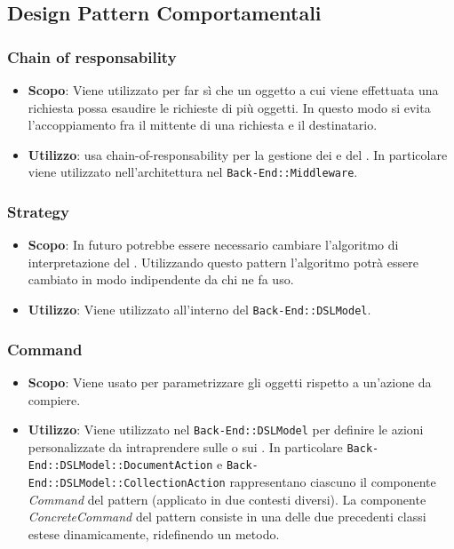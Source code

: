 \subsection{Design Pattern Comportamentali}

\subsubsection{Chain of responsability}
\label{chain-of-responsability}

\begin{itemize}

	\item \textbf{Scopo}: Viene utilizzato per far sì che un oggetto a cui viene effettuata una richiesta possa esaudire le richieste di più oggetti. In questo modo si evita l'accoppiamento fra il mittente di una richiesta e il destinatario.
	\item \textbf{Utilizzo}:  usa chain-of-responsability per la gestione dei  e del . In particolare viene utilizzato nell'architettura nel  \texttt{Back-End::Middleware}.

\end{itemize}

\subsubsection{Strategy}

\begin{itemize}

	\item \textbf{Scopo}: In futuro potrebbe essere necessario cambiare l'algoritmo di interpretazione del . Utilizzando questo pattern l'algoritmo potrà essere cambiato in modo indipendente da chi ne fa uso.
	\item \textbf{Utilizzo}: Viene utilizzato all'interno del  \texttt{Back-End::DSLModel}.

\end{itemize}

\subsubsection{Command}

\begin{itemize}

	\item \textbf{Scopo}: Viene usato per parametrizzare gli oggetti rispetto a un'azione da compiere.
	\item \textbf{Utilizzo}: Viene utilizzato nel  \texttt{Back-End::DSLModel} per definire le azioni personalizzate da intraprendere sulle  o sui . In particolare \texttt{Back-End::DSLModel::DocumentAction} e \texttt{Back-End::DSLModel::CollectionAction} rappresentano ciascuno il componente \textit{Command} del pattern (applicato in due contesti diversi). La componente \textit{ConcreteCommand} del pattern consiste in una delle due precedenti classi estese dinamicamente, ridefinendo un metodo.

\end{itemize}